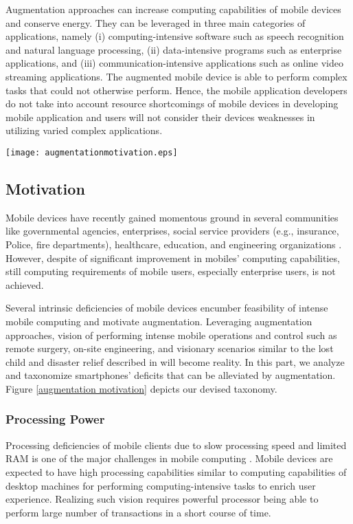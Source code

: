 \documentclass[publish]{IEEEtran}
\begin{document}
Augmentation approaches can increase computing capabilities of mobile devices and conserve energy. They can be leveraged in three main categories of applications, namely (i) computing-intensive software such as speech recognition and natural language processing, (ii) data-intensive programs such as enterprise applications, and (iii) communication-intensive applications such as online video streaming applications. The augmented mobile device is able to perform complex tasks that could not otherwise perform. Hence, the mobile application developers do not take into account resource shortcomings of mobile devices in developing mobile application and users will not consider their devices weaknesses in utilizing varied complex applications. 

\begin{figure*}[t]
\begin{center}
\texttt{[image: augmentationmotivation.eps]}
\caption{Taxonomy of Augmentation Motivation: Intrinsic and non-intrinsic mobile challenges motivate augmentation.} \label{augmentation motivation}
\end{center}
\end{figure*}

\subsection{Motivation} \label{motivation}
Mobile devices have recently gained momentous ground in several communities like governmental agencies, enterprises, social service providers (e.g., insurance, Police, fire departments), healthcare, education, and engineering organizations \cite{Bent2012, Khalifa2011}. However, despite of significant improvement in mobiles' computing capabilities, still computing requirements of mobile users, especially enterprise users, is not achieved. 

Several intrinsic deficiencies of mobile devices encumber feasibility of intense mobile computing and motivate augmentation. Leveraging augmentation approaches, vision of performing intense mobile operations and control such as remote surgery, on-site engineering, and visionary scenarios similar to the lost child and disaster relief described in \cite{Satyanarayananb} will become reality. In this part, we analyze and taxonomize smartphones' deficits that can be alleviated by augmentation. Figure \ref{augmentation motivation} depicts our devised taxonomy.

\subsubsection{Processing Power}
Processing deficiencies of mobile clients due to slow processing speed and limited RAM is one of the major challenges in mobile computing \cite{Satyanarayananb}. Mobile devices are expected to have high processing capabilities similar to computing capabilities of desktop machines for performing computing-intensive tasks to enrich user experience. Realizing such vision requires powerful processor being able to perform large number of transactions in a short course of time. 
\end{document}
